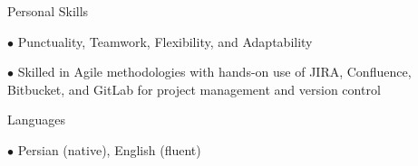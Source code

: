 \begin{cvskills}
\cvskill
{Personal Skills} %
{
\item[$\bullet$] Punctuality, Teamwork, Flexibility, and Adaptability
\item[$\bullet$] Skilled in Agile methodologies with hands-on use of JIRA, Confluence, Bitbucket, and GitLab for project management and version control
}

\cvskill
{Languages} %
{\item[$\bullet$] Persian (native), English (fluent)} %


\end{cvskills}
